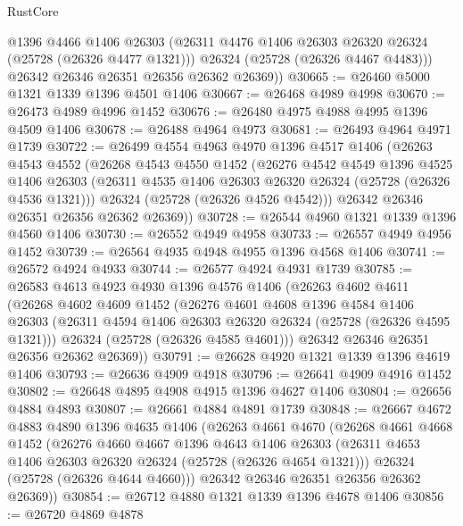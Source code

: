 \begin{lexlean}{RustCore}
\begin{coremodule}
          @1396
          @4466
          @1406
          @26303
          (@26311 @4476 @1406 @26303 @26320 @26324 (@25728 (@26326 @4477 @1321)))
          @26324
          (@25728 (@26326 @4467 @4483)))
        @26342
        @26346
        @26351
        @26356
        @26362
        @26369))
@30665 := @26460 @5000 @1321 @1339 @1396 @4501 @1406
@30667 := @26468 @4989 @4998
@30670 := @26473 @4989 @4996 @1452
@30676 := @26480 @4975 @4988 @4995 @1396 @4509 @1406
@30678 := @26488 @4964 @4973
@30681 := @26493 @4964 @4971 @1739
@30722 := @26499
    @4554
    @4963
    @4970
    @1396
    @4517
    @1406
    (@26263
      @4543
      @4552
      (@26268
        @4543
        @4550
        @1452
        (@26276
          @4542
          @4549
          @1396
          @4525
          @1406
          @26303
          (@26311 @4535 @1406 @26303 @26320 @26324 (@25728 (@26326 @4536 @1321)))
          @26324
          (@25728 (@26326 @4526 @4542)))
        @26342
        @26346
        @26351
        @26356
        @26362
        @26369))
@30728 := @26544 @4960 @1321 @1339 @1396 @4560 @1406
@30730 := @26552 @4949 @4958
@30733 := @26557 @4949 @4956 @1452
@30739 := @26564 @4935 @4948 @4955 @1396 @4568 @1406
@30741 := @26572 @4924 @4933
@30744 := @26577 @4924 @4931 @1739
@30785 := @26583
    @4613
    @4923
    @4930
    @1396
    @4576
    @1406
    (@26263
      @4602
      @4611
      (@26268
        @4602
        @4609
        @1452
        (@26276
          @4601
          @4608
          @1396
          @4584
          @1406
          @26303
          (@26311 @4594 @1406 @26303 @26320 @26324 (@25728 (@26326 @4595 @1321)))
          @26324
          (@25728 (@26326 @4585 @4601)))
        @26342
        @26346
        @26351
        @26356
        @26362
        @26369))
@30791 := @26628 @4920 @1321 @1339 @1396 @4619 @1406
@30793 := @26636 @4909 @4918
@30796 := @26641 @4909 @4916 @1452
@30802 := @26648 @4895 @4908 @4915 @1396 @4627 @1406
@30804 := @26656 @4884 @4893
@30807 := @26661 @4884 @4891 @1739
@30848 := @26667
    @4672
    @4883
    @4890
    @1396
    @4635
    @1406
    (@26263
      @4661
      @4670
      (@26268
        @4661
        @4668
        @1452
        (@26276
          @4660
          @4667
          @1396
          @4643
          @1406
          @26303
          (@26311 @4653 @1406 @26303 @26320 @26324 (@25728 (@26326 @4654 @1321)))
          @26324
          (@25728 (@26326 @4644 @4660)))
        @26342
        @26346
        @26351
        @26356
        @26362
        @26369))
@30854 := @26712 @4880 @1321 @1339 @1396 @4678 @1406
@30856 := @26720 @4869 @4878

\end{coremodule}
\end{lexlean}
